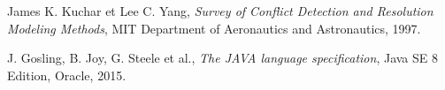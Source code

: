 
\begin{thebibliography}{99}

 James K. Kuchar et Lee C. Yang,
\emph{Survey of Conflict Detection and Resolution Modeling Methods}, MIT Department of Aeronautics and Astronautics, 1997.

 J. Gosling, B. Joy, G. Steele et al.,
\emph{The JAVA\textsuperscript{\textregistered}  language specification},
Java SE 8 Edition, Oracle, 2015.
\end{thebibliography}